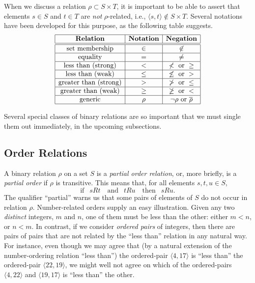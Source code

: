 \noindent
When we discuss a relation $\rho \subset S \times T$, it is important
to be able to assert that elements $s \in S$ and $t \in T$ are {\em
  not} $\rho$-related, i.e., $\langle s, t
\rangle \not\in S \times T$.  Several notations have been developed
for this purpose, as the following table suggests.
\begin{equation}
\label{eq:NOT-rho-notation}
\begin{array}{|c|c|c|c|}
\hline
\mbox{\bf Relation} & \mbox{\bf Notation} & \mbox{\bf Negation}  \\
\hline
\hline
\mbox{set membership} & \in & \not\in  \\
\hline
\mbox{equality}       & =   & \neq     \\
\hline
\mbox{less than (strong)} & < & \not < \mbox{ or } \geq \\
\hline
\mbox{less than (weak)} & \leq & \not\leq \mbox{ or } >  \\
\hline
\mbox{greater than (strong)} & > & \not > \mbox{ or } \leq  \\
\hline
\mbox{greater than (weak)} & \geq & \not\geq \mbox{ or } <  \\
\hline
\mbox{generic}  & \rho  & \neg\rho \mbox{ or } \overline{\rho} \\
\hline
\end{array}
\end{equation}

\medskip

Several special classes of binary relations are so important that we
must single them out immediately, in the upcoming subsections.


\subsection{Order Relations}
\label{sec:order-relation}

A binary relation $\rho$ on a set $S$ is a {\it partial order
  relation},
 or,
more briefly, is a {\it partial order} if $\rho$ is
transitive. This means that, for all
elements $s, t, u \in S$,
\begin{equation}
\label{eq:def-transitive}
\mbox{if } \ \ sRt \ \ \ \mbox{ and } \ \ tRu \ \ \ \mbox{ then }
\  \ sRu.
\end{equation}
The qualifier ``partial'' warns us that some pairs of elements of $S$
do not occur in relation $\rho$.  Number-related orders supply an easy
illustration.  Given any two {\em distinct} integers, $m$ and $n$, one
of them must be less than the other: either $m < n$, or $n < m$.  In
contrast, if we consider {\it ordered pairs} of integers, then there
are pairs of pairs that are not related by the ``less than'' relation
in any natural way.  For instance, even though we may agree that (by a
natural extension of the number-ordering relation ``less than'') the
ordered-pair $\langle 4, 17 \rangle$ is ``less than'' the ordered-pair
$\langle 22, 19 \rangle$, we might well not agree on which of the
ordered-pairs $\langle 4, 22 \rangle$ and $\langle 19, 17 \rangle$ is
``less than'' the other.

